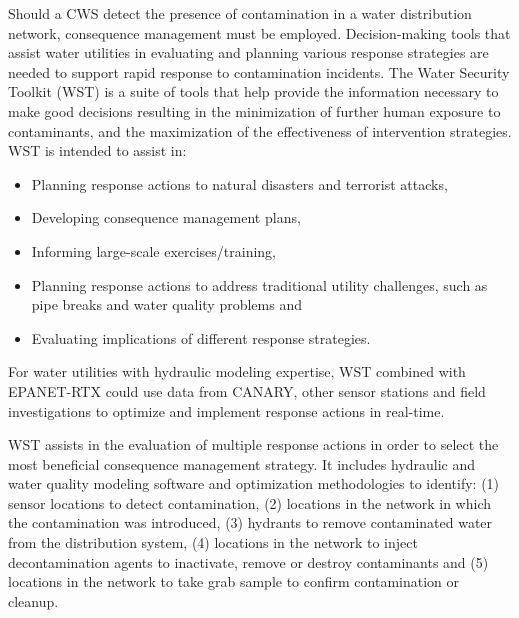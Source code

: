 Should a CWS detect the presence of contamination in a water distribution network, consequence management must be employed. 
Decision-making tools that assist water utilities in evaluating and planning various response strategies 
are needed to support rapid response to contamination incidents. The Water Security Toolkit (WST) is a suite 
of tools that help provide the information necessary to make good decisions 
resulting in the minimization of further human exposure to contaminants, and the maximization of the 
effectiveness of intervention strategies. WST is intended to assist in: 
\begin{itemize}
\item Planning response actions to natural disasters and terrorist attacks, 
\item Developing consequence management plans, 
\item Informing large-scale exercises/training, 
\item Planning response actions to address traditional utility challenges, such as pipe breaks and water quality problems and 
\item Evaluating implications of different response strategies. 
\end{itemize}
For water utilities with hydraulic modeling expertise, WST combined with EPANET-RTX \citep{EPANETRTX,HatchettetalRTX2011,JankeetalRTX2011} 
could use data from CANARY, other sensor stations and field investigations to optimize and 
implement response actions in real-time. 

WST assists in the evaluation of multiple response actions in order to select the most 
beneficial consequence management strategy. It includes hydraulic and water quality 
modeling software and optimization methodologies to identify: (1) sensor locations to detect contamination,
(2) locations in the network in which the contamination was introduced, (3) hydrants to 
remove contaminated water from the distribution system, (4) locations in the network to inject 
decontamination agents to inactivate, remove or destroy contaminants and (5) locations in the network to take grab
sample to confirm contamination or cleanup.

